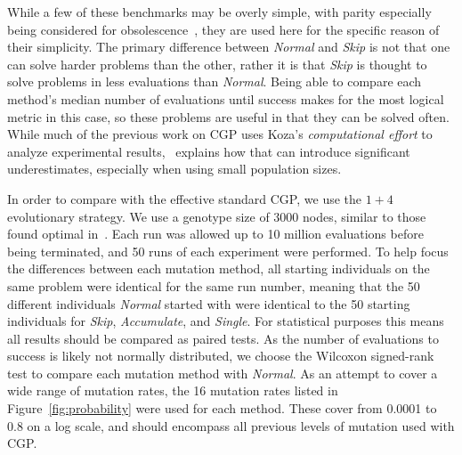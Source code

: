 \documentclass[runningheads,a4paper]{llncs}
\begin{document}
While a few of these benchmarks may be overly simple, with parity especially
being considered for obsolescence~\cite{mcdermott:2012:benchmarks}, they are used here
for the specific reason of their simplicity.  The primary
difference between \emph{Normal} and \emph{Skip}
is not that one can solve harder problems than the other, rather it is that \emph{Skip} is thought
to solve problems in less evaluations than \emph{Normal}.  Being able to compare each method's
median number of evaluations until success makes for the most logical metric in this case,
so these problems are useful in that they can be solved often.  While much of the
previous work on CGP uses Koza's \emph{computational effort} to analyze experimental
results,~\cite{christensen:2002:comp_effort} explains how that can introduce
significant underestimates, especially when using small population sizes.

In order to compare with the effective standard CGP, we use the $1+4$
evolutionary strategy.  We use a
genotype size of 3000 nodes, similar to those found optimal in~\cite{miller:2006:redundancy}.
Each run was allowed up to
10 million evaluations before being terminated, and 50 runs of each experiment
were performed.  To help focus the differences between each mutation method,
all starting individuals on the same problem were identical for the same run number,
meaning that the 50 different individuals \emph{Normal} started with were identical
to the 50 starting individuals for \emph{Skip}, \emph{Accumulate}, and \emph{Single}.
For statistical purposes this means all results should be compared as paired tests.
As the number of evaluations to success is likely not normally distributed, we choose
the Wilcoxon signed-rank test to compare each mutation method with \emph{Normal}.
As an attempt to cover a wide range of mutation rates, the 16 mutation rates listed
in Figure~\ref{fig:probability} were used for each method.  These cover from 0.0001
to 0.8 on a log scale, and should encompass all previous levels of mutation used
with CGP.

\begin{comment}
We had intended to include Koza-1 and Pagie-1 from~\cite{mcdermott:2012:benchmarks}
as sample regression problems, but we had difficulty achieving acceptable success
rates to allow for comparisons here.  Future work may be needed to understand why
these problems were significantly harder when using our configuration settings
than the four binary problems. 
\end{comment}
\end{document}
